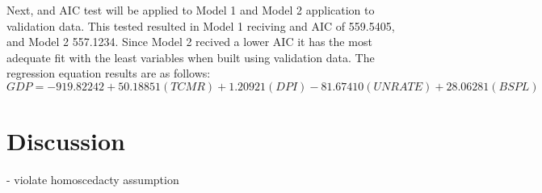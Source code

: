 \documentclass[12pt]{article}
\begin{document}
Next, and AIC test will be applied to Model 1 and Model 2 application to validation data. 
This tested resulted in Model 1 reciving and AIC of 559.5405, and Model 2 557.1234. 
Since Model 2 recived a lower AIC it has the most adequate fit with the least variables when built using validation data. 
The regression equation results are as follows: 
\begin{equation}
  GDP = -919.82242+50.18851(TCMR)+1.20921(DPI)-81.67410(UNRATE)+28.06281(BSPL)
\end{equation}

\section*{Discussion}


- violate homoscedacty assumption



\end{document}
